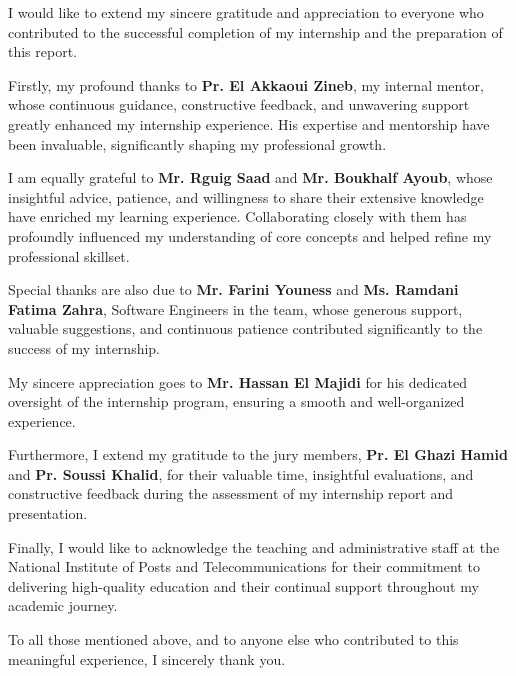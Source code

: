I would like to extend my sincere gratitude and appreciation to everyone who contributed to the successful completion of my internship and the preparation of this report.\mynewline

Firstly, my profound thanks to \textbf{Pr. El Akkaoui Zineb}, my internal mentor, whose continuous guidance, constructive feedback, and unwavering support greatly enhanced my internship experience. His expertise and mentorship have been invaluable, significantly shaping my professional growth.

I am equally grateful to \textbf{Mr. Rguig Saad} and \textbf{Mr. Boukhalf Ayoub}, whose insightful advice, patience, and willingness to share their extensive knowledge have enriched my learning experience. Collaborating closely with them has profoundly influenced my understanding of core concepts and helped refine my professional skillset.

Special thanks are also due to \textbf{Mr. Farini Youness} and \textbf{Ms. Ramdani Fatima Zahra}, Software Engineers in the team, whose generous support, valuable suggestions, and continuous patience contributed significantly to the success of my internship.

My sincere appreciation goes to \textbf{Mr. Hassan El Majidi} for his dedicated oversight of the internship program, ensuring a smooth and well-organized experience.

Furthermore, I extend my gratitude to the jury members, \textbf{Pr. El Ghazi Hamid} and \textbf{Pr. Soussi Khalid}, for their valuable time, insightful evaluations, and constructive feedback during the assessment of my internship report and presentation.

Finally, I would like to acknowledge the teaching and administrative staff at the National Institute of Posts and Telecommunications for their commitment to delivering high-quality education and their continual support throughout my academic journey.\mynewline

To all those mentioned above, and to anyone else who contributed to this meaningful experience, I sincerely thank you.